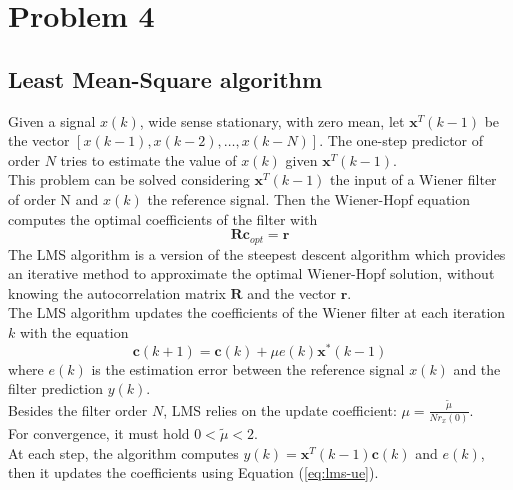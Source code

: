 \documentclass[a4paper, 12pt]{report}
\begin{document}
\section*{Problem 4}

\subsection*{Least Mean-Square algorithm}
Given a signal $x(k)$, wide sense stationary, with zero mean, let $\mathbf{x}^T(k-1)$ be the vector $[x(k-1), x(k-2), \dots, x(k-N)]$. The one-step predictor of order $N$ tries to estimate the value of $x(k)$ given $\mathbf{x}^T(k-1)$.\\
This problem can be solved considering $\mathbf{x}^T(k-1)$ the input of a Wiener filter of order N and $x(k)$ the reference signal. Then the Wiener-Hopf equation computes the optimal coefficients of the filter with
\begin{equation}
	\mathbf{R} \mathbf{c}_{opt} = \mathbf{r}
\end{equation}
The LMS algorithm is a version of the steepest descent algorithm which provides an iterative method to approximate the optimal Wiener-Hopf solution, without knowing the autocorrelation matrix $\mathbf{R}$ and the vector $\mathbf{r}$.\\
The LMS algorithm updates the coefficients of the Wiener filter at each iteration $k$ with the equation
\begin{equation}\label{eq:lms-ue}
	\mathbf{c}(k+1) = \mathbf{c}(k) + \mu e(k) \mathbf{x}^*(k-1)
\end{equation}
where $e(k)$ is the estimation error between the reference signal $x(k)$ and the filter prediction $y(k)$.\\
Besides the filter order $N$, LMS relies on the update coefficient: $\mu = \frac{\tilde{\mu}}{N r_x(0)}$.\\
For convergence, it must hold $0 < \tilde{\mu} < 2$.\\
At each step, the algorithm computes $ y(k) = \mathbf{x}^T(k-1) \mathbf{c}(k)$ and $e(k)$, then it updates the coefficients using Equation (\ref{eq:lms-ue}).
\end{document}
